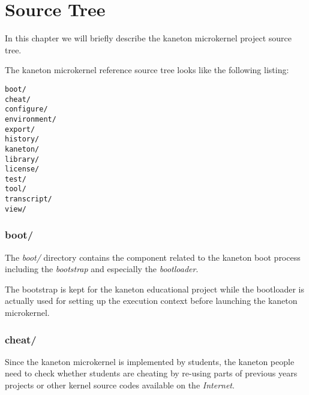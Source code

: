 %
%
%
%
%
%

%
%

\chapter{Source Tree}
\label{chapter:source tree}

In this chapter we will briefly describe the kaneton microkernel project
source tree.

\newpage

%
%

The kaneton microkernel reference source tree looks like the following
listing:

\begin{verbatim}
boot/
cheat/
configure/
environment/
export/
history/
kaneton/
library/
license/
test/
tool/
transcript/
view/
\end{verbatim}

%
%

\subsection*{boot/}

The \textit{boot/} directory contains the component related to the kaneton
boot process including the \textit{bootstrap} and especially the
\textit{bootloader}.

The bootstrap is kept for the kaneton educational project while the bootloader
is actually used for setting up the execution context before launching
the kaneton microkernel.

%
%

\subsection*{cheat/}

Since the kaneton microkernel is implemented by students, the kaneton
people need to check whether students are cheating by re-using parts of
previous years projects or other kernel source codes available on the
\textit{Internet}.


